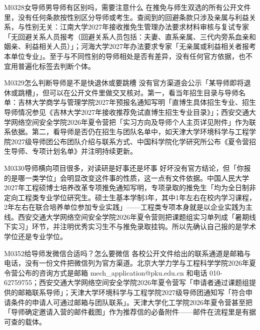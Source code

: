 \begin{qa}{M0328}{女导师男导师有区别吗，需要注意什么}
在推免与师生双选的所有公开文件里，没有任何条款按性别区分导师或考生。查阅到的回避条款只涉及亲属与利益关系，与性别无关：江南大学2027年接收推免生管理办法要求材料审核与复试专家「无回避关系人员报考（回避关系人员包括：夫妻、直系亲属、三代内旁系血亲和姻亲、利益相关人员）」；河海大学2027年办法要求专家「无亲属或利益相关者报考本单位专业」。至于与不同性别的导师相处是否有差异，没有任何官方依据，也不宜用普遍化标签去判断个体。
\end{qa}

\begin{qa}{M0329}{怎么判断导师是不是快退休或要跳槽}
没有官方渠道会公示「某导师即将退休或跳槽」，但可以在公开文件里做交叉核对。第一，看当年招生目录与导师名单：吉林大学商学与管理学院2027年预报名通知写明「直博生具体招生专业、招生导师情况参见《吉林大学2027年接收推荐免试直博生招生专业目录》」；西安交通大学网络空间安全学院2026年夏令营把「实习方向及导师个人主页详见附件」作为联系依据。第二，看导师是否仍在招生与团队名单中，如天津大学环境科学与工程学院2027级导师团公布团队介绍与联系方式、中国科学院化学研究所公布《夏令营招生导师、专项计划名单》并注明持续更新。
\end{qa}

\begin{qa}{M0330}{导师横向项目很多，对读研是好事还是坏事}
好坏没有官方结论，但「你报的是哪一类学位」会明显改变这件事的性质，这一点有文件依据。中国人民大学2027年工程硕博士培养改革专项推免通知写明，专项录取的推免生「均为全日制非定向工程类专业学位研究生。硕士生基本学制3年，其中1年左右在校内学习课程，2年左右在联合培养单位参加专业实践」——工程类专项本身就是以企业实践为主线。西安交通大学网络空间安全学院2026年夏令营则把课题组实习单列成「暑期线下实习」环节，并注明优秀实习生不与推免录取挂钩。所以先确认自己报的是学术学位还是专业学位。
\end{qa}

\begin{qa}{M0352}{给导师发微信合适吗？怎么要微信}
各校公开文件给出的联系通道是邮箱与电话，没有一份文件把微信列为官方渠道。北京大学力学与工程科学学院2026年夏令营公布的咨询方式是邮箱 mech\_application@pku.edu.cn 和电话 010-62759755；西安交通大学网络空间安全学院2026年夏令营写「申请者通过课题组提供的邮箱联系导师」；天津大学环境科学与工程学院2027级导师团通知写「符合申请条件的申请人可通过邮箱与团队联系」。天津大学化工学院2026年夏令营甚至把「导师确定邀请入营的邮件截图」作为推荐信的必备附件——邮件在流程里是有据可查的载体。
\end{qa}

